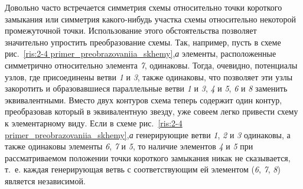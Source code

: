 Довольно часто встречается симметрия схемы относительно точки короткого замыкания или симметрия какого-нибудь участка схемы относительно некоторой промежуточной точки. Использование этого обстоятельства позволяет значительно упростить преобразование схемы. Так, например, пусть в схеме рис.~\ref{ris:2-4 primer_preobrazovaniia_skhemy},\textit{а} элементы, расположенные симметрично относительно элемента \textit{7}, одинаковы. Тогда, очевидно, потенциалы узлов, где присоединены ветви \textit{1} и \textit{3}, также одинаковы, что позволяет эти узлы закоротить и образовавшиеся параллельные ветви \textit{1} и \textit{3}, \textit{4} и \textit{5}, \textit{6} и \textit{8} заменить эквивалентными. Вместо двух контуров схема теперь содержит один контур, преобразовав который в эквивалентную звезду, уже совеем легко привести схему к элементарному виду. Если в схеме рис.~\ref{ris:2-4 primer_preobrazovaniia_skhemy},\textit{а} генерирующие ветви \textit{1}, \textit{2} и \textit{3} одинаковы, а также одинаковы элементы \textit{6}, \textit{7} и \textit{5}, то наличие элементов \textit{4} и \textit{5} при рассматриваемом положении точки короткого замыкания никак не сказывается, т.~е. каждая генерирующая ветвь с соответствующим ей элементом (\textit{6}, \textit{7}, \textit{8}) является независимой.


